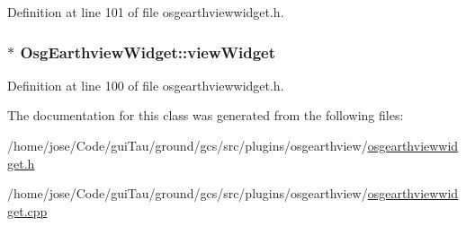 Definition at line 101 of file osgearthviewwidget.\-h.

\hypertarget{class_osg_earthview_widget_a2a1b22b5eafba67d10492824bdd9bdb8}{
\subsubsection[{view\-Widget}]{$\ast$ Osg\-Earthview\-Widget\-::view\-Widget\hspace{0.3cm}{\ttfamily [protected]}}}\label{class_osg_earthview_widget_a2a1b22b5eafba67d10492824bdd9bdb8}


Definition at line 100 of file osgearthviewwidget.\-h.



The documentation for this class was generated from the following files\-:\begin{DoxyCompactItemize}
\item 
/home/jose/\-Code/gui\-Tau/ground/gcs/src/plugins/osgearthview/\hyperlink{osgearthviewwidget_8h}{osgearthviewwidget.\-h}\item 
/home/jose/\-Code/gui\-Tau/ground/gcs/src/plugins/osgearthview/\hyperlink{osgearthviewwidget_8cpp}{osgearthviewwidget.\-cpp}\end{DoxyCompactItemize}
